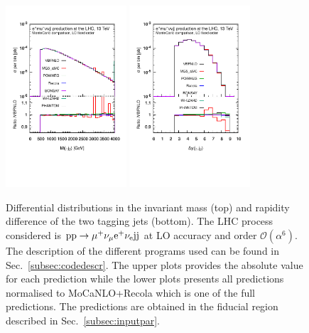  \begin{figure}[h!]
   \centering
   \includegraphics[width=0.4\textwidth,angle=0,clip=true,trim={0.4cm 2cm 0.cm 1.cm}]{figures/LO/mjj_LO.pdf}
   \includegraphics[width=0.4\textwidth,angle=0,clip=true,trim={0.4cm 2cm 0.cm 1.cm}]{figures/LO/dyj1j2_LO.pdf}
\caption{\label{fig:wg1_mjj-llLO} Differential distributions in the invariant mass (top) and rapidity difference of the two tagging jets (bottom).
The LHC process considered is ${\rm p}{\rm p}\to\mu^+\nu_\mu{\rm e}^+\nu_{\rm e}{\rm j}{\rm j}$ at LO accuracy and order $\mathcal{O}(\alpha^6)$.
The description of the different programs used can be found in Sec.~\ref{subsec:codedescr}.
The upper plots provides the absolute value for each prediction while the lower plots presents all predictions normalised to {\sc MoCaNLO}+{\sc Recola} which is one of the full predictions.
The predictions are obtained in the fiducial region described in Sec.~\ref{subsec:inputpar}.
}
\end{figure}

